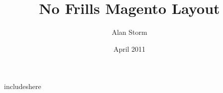 \documentclass[oneside]{book}
\begin{document}
\title{No Frills Magento Layout}
\author{Alan Storm}
\date{April 2011}

\maketitle
\tableofcontents
\setcounter{chapter}{-1}

includeshere

%
%
\end{document}
